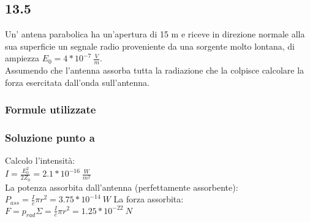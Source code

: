 \documentclass[../../main.tex]{subfiles}
\begin{document}
\subsection*{13.5}
Un' antena parabolica ha un'apertura di 15 m e riceve in direzione normale alla sua superficie un segnale radio proveniente da una sorgente molto lontana, di ampiezza $E_0 = 4 * 10^{-7}\ \frac{V}{m}$.\\
Assumendo che l'antenna assorba tutta la radiazione che la colpisce calcolare la forza esercitata dall'onda sull'antenna.
\subsubsection*{Formule utilizzate}
\subsubsection*{Soluzione punto a}
Calcolo l'intensità:\\
$I = \frac{E_0^2}{2Z_0} = 2.1 * 10^{-16}\ \frac{W}{m^2}$\\
La potenza assorbita dall'antenna (perfettamente assorbente):\\
$P_{ass} = \frac{I}{c}\pi r^2 = 3.75 * 10^{-14}\ W$
La forza assorbita:\\
$F = p_{rad}\Sigma = \frac{I}{c}\pi r^2 = 1.25 * 10^{-22}\ N$
\newpage
\end{document}
